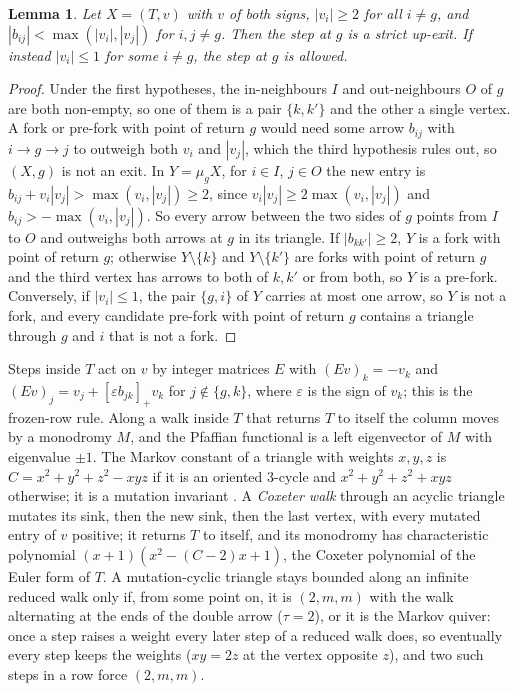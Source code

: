 \documentclass[11pt]{amsart}
\newtheorem{lemma}[theorem]{Lemma}
\theoremstyle{definition}
\theoremstyle{remark}
\newcommand{\pos}[1]{[#1]_+}
\begin{document}
\begin{lemma}\label{lem:dominant}
Let $X=(T,v)$ with $v$ of both signs, $|v_i|\ge2$ for all $i\ne g$, and $|b_{ij}|<\max(|v_i|,|v_j|)$ for $i,j\ne g$. Then the step at $g$ is a strict up-exit. If instead $|v_i|\le1$ for some $i\ne g$, the step at $g$ is allowed.
\end{lemma}
\begin{proof}
Under the first hypotheses, the in-neighbours $I$ and out-neighbours $O$ of $g$ are both non-empty, so one of them is a pair $\{k,k'\}$ and the other a single vertex. A fork or pre-fork with point of return $g$ would need some arrow $b_{ij}$ with $i\to g\to j$ to outweigh both $v_i$ and $|v_j|$, which the third hypothesis rules out, so $(X,g)$ is not an exit. In $Y=\mu_gX$, for $i\in I$, $j\in O$ the new entry is $b_{ij}+v_i|v_j|>\max(v_i,|v_j|)\ge2$, since $v_i|v_j|\ge2\max(v_i,|v_j|)$ and $b_{ij}>-\max(v_i,|v_j|)$. So every arrow between the two sides of $g$ points from $I$ to $O$ and outweighs both arrows at $g$ in its triangle. If $|b_{kk'}|\ge2$, $Y$ is a fork with point of return $g$; otherwise $Y\setminus\{k\}$ and $Y\setminus\{k'\}$ are forks with point of return $g$ and the third vertex has arrows to both of $k,k'$ or from both, so $Y$ is a pre-fork. Conversely, if $|v_i|\le1$, the pair $\{g,i\}$ of $Y$ carries at most one arrow, so $Y$ is not a fork, and every candidate pre-fork with point of return $g$ contains a triangle through $g$ and $i$ that is not a fork.
\end{proof}

Steps inside $T$ act on $v$ by integer matrices $E$ with $(Ev)_k=-v_k$ and $(Ev)_j=v_j+\pos{\varepsilon b_{jk}}v_k$ for $j\notin\{g,k\}$, where $\varepsilon$ is the sign of $v_k$; this is the frozen-row rule. Along a walk inside $T$ that returns $T$ to itself the column moves by a monodromy $M$, and the Pfaffian functional is a left eigenvector of $M$ with eigenvalue $\pm1$. The Markov constant of a triangle with weights $x,y,z$ is $C=x^2+y^2+z^2-xyz$ if it is an oriented $3$-cycle and $x^2+y^2+z^2+xyz$ otherwise; it is a mutation invariant \cite{BBH}. A \emph{Coxeter walk} through an acyclic triangle mutates its sink, then the new sink, then the last vertex, with every mutated entry of $v$ positive; it returns $T$ to itself, and its monodromy has characteristic polynomial $(x+1)(x^2-(C-2)x+1)$, the Coxeter polynomial of the Euler form of $T$. A mutation-cyclic triangle stays bounded along an infinite reduced walk only if, from some point on, it is $(2,m,m)$ with the walk alternating at the ends of the double arrow ($\tau=2$), or it is the Markov quiver: once a step raises a weight every later step of a reduced walk does, so eventually every step keeps the weights ($xy=2z$ at the vertex opposite $z$), and two such steps in a row force $(2,m,m)$.
\end{document}
